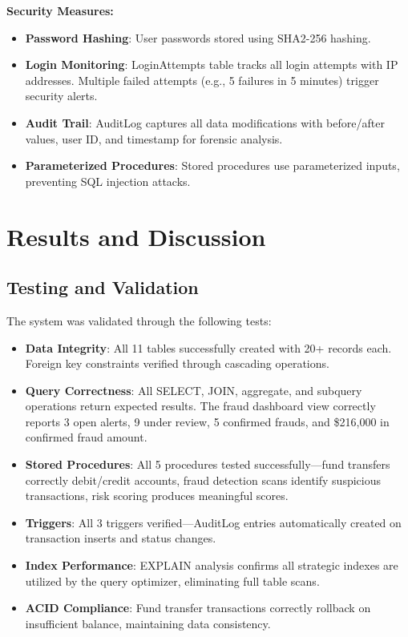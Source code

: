 \documentclass[a4paper,12pt]{article}
\begin{document}
\textbf{Security Measures:}
\begin{itemize}
    \item \textbf{Password Hashing}: User passwords stored using SHA2-256 hashing.
    \item \textbf{Login Monitoring}: LoginAttempts table tracks all login attempts with IP addresses. Multiple failed attempts (e.g., 5 failures in 5 minutes) trigger security alerts.
    \item \textbf{Audit Trail}: AuditLog captures all data modifications with before/after values, user ID, and timestamp for forensic analysis.
    \item \textbf{Parameterized Procedures}: Stored procedures use parameterized inputs, preventing SQL injection attacks.
\end{itemize}

\section{Results and Discussion}

\subsection{Testing and Validation}
The system was validated through the following tests:
\begin{itemize}
    \item \textbf{Data Integrity}: All 11 tables successfully created with 20+ records each. Foreign key constraints verified through cascading operations.
    \item \textbf{Query Correctness}: All SELECT, JOIN, aggregate, and subquery operations return expected results. The fraud dashboard view correctly reports 3 open alerts, 9 under review, 5 confirmed frauds, and \$216,000 in confirmed fraud amount.
    \item \textbf{Stored Procedures}: All 5 procedures tested successfully---fund transfers correctly debit/credit accounts, fraud detection scans identify suspicious transactions, risk scoring produces meaningful scores.
    \item \textbf{Triggers}: All 3 triggers verified---AuditLog entries automatically created on transaction inserts and status changes.
    \item \textbf{Index Performance}: EXPLAIN analysis confirms all strategic indexes are utilized by the query optimizer, eliminating full table scans.
    \item \textbf{ACID Compliance}: Fund transfer transactions correctly rollback on insufficient balance, maintaining data consistency.
\end{itemize}
\end{document}
